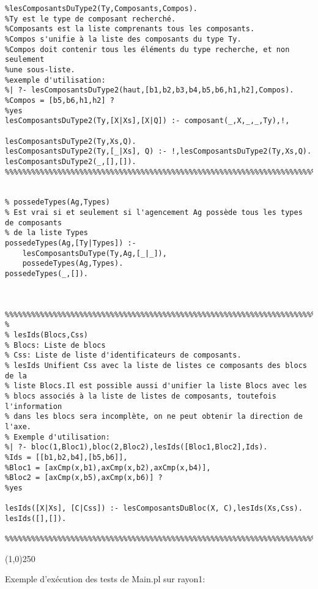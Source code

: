 \documentclass[letterpaper,11pt]{letter}
\begin{document}
\begin{verbatim}
%lesComposantsDuType2(Ty,Composants,Compos).
%Ty est le type de composant recherché.
%Composants est la liste comprenants tous les composants.
%Compos s'unifie à la liste des composants du type Ty.
%Compos doit contenir tous les éléments du type recherche, et non seulement
%une sous-liste.
%exemple d'utilisation:
%| ?- lesComposantsDuType2(haut,[b1,b2,b3,b4,b5,b6,h1,h2],Compos).
%Compos = [b5,b6,h1,h2] ? 
%yes
lesComposantsDuType2(Ty,[X|Xs],[X|Q]) :- composant(_,X,_,_,Ty),!,
                                         lesComposantsDuType2(Ty,Xs,Q).
lesComposantsDuType2(Ty,[_|Xs], Q) :- !,lesComposantsDuType2(Ty,Xs,Q).
lesComposantsDuType2(_,[],[]).
%%%%%%%%%%%%%%%%%%%%%%%%%%%%%%%%%%%%%%%%%%%%%%%%%%%%%%%%%%%%%%%%%%%%%%%%%%%%%%%%%


% possedeTypes(Ag,Types)
% Est vrai si et seulement si l'agencement Ag possède tous les types de composants
% de la liste Types
possedeTypes(Ag,[Ty|Types]) :-
	lesComposantsDuType(Ty,Ag,[_|_]),
	possedeTypes(Ag,Types).
possedeTypes(_,[]).



%%%%%%%%%%%%%%%%%%%%%%%%%%%%%%%%%%%%%%%%%%%%%%%%%%%%%%%%%%%%%%%%%%%%%%%%%%%%%%%
% 
% lesIds(Blocs,Css)
% Blocs: Liste de blocs
% Css: Liste de liste d'identificateurs de composants.
% lesIds Unifient Css avec la liste de listes ce composants des blocs de la 
% liste Blocs.Il est possible aussi d'unifier la liste Blocs avec les
% blocs associés à la liste de listes de composants, toutefois l'information
% dans les blocs sera incomplète, on ne peut obtenir la direction de l'axe.
% Exemple d'utilisation:
%| ?- bloc(1,Bloc1),bloc(2,Bloc2),lesIds([Bloc1,Bloc2],Ids).
%Ids = [[b1,b2,b4],[b5,b6]],
%Bloc1 = [axCmp(x,b1),axCmp(x,b2),axCmp(x,b4)],
%Bloc2 = [axCmp(x,b5),axCmp(x,b6)] ? 
%yes 

lesIds([X|Xs], [C|Css]) :- lesComposantsDuBloc(X, C),lesIds(Xs,Css).
lesIds([],[]).

%%%%%%%%%%%%%%%%%%%%%%%%%%%%%%%%%%%%%%%%%%%%%%%%%%%%%%%%%%%%%%%%%%%%%%%%%%%%%%%
\end{verbatim}


\begin{center}
\line(1,0){250}
\end{center}

Exemple d'exécution des tests de Main.pl sur rayon1:
\end{document}
